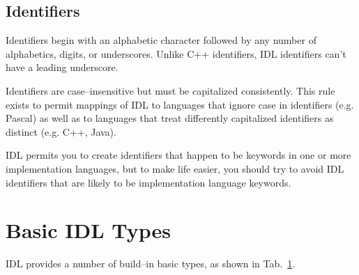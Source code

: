 \subsection{Identifiers}
Identifiers begin with an alphabetic character followed by any number of
alphabetics, digits, or underscores. Unlike C++ identifiers, IDL identifiers
can't have a leading underscore.

Identifiers are case--insensitive but must be capitalized consistently. 
This rule exists to permit mappings of IDL to languages that ignore case in
identifiers (e.g. Pascal) as well as to languages that treat differently
capitalized identifiers as distinct (e.g. C++, Java).

IDL permits you to create identifiers that happen to be keywords in one or more
implementation languages, but to make life easier, you should try to avoid IDL
identifiers that are likely to be implementation language keywords.

\newpage
\section{Basic IDL Types}
IDL provides a number of build--in basic types, as shown in Tab.~\ref{}.

